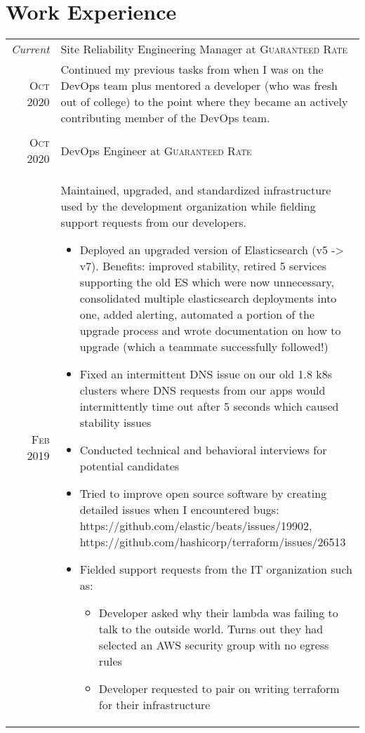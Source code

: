 \documentclass[a4paper,10pt]{article}
\begin{document}
\section{Work Experience}
\begin{tabular}{r|p{13cm}}
 \emph{Current} & Site Reliability Engineering Manager at \textsc{Guaranteed Rate} \\
 \textsc{Oct 2020} &
 \footnotesize{Continued my previous tasks from when I was on the DevOps team plus mentored a developer (who was fresh out of college) to the point where they became an actively contributing member of the DevOps team.}
 \\
 \multicolumn{2}{c}{} \\
 \textsc{Oct 2020} & DevOps Engineer at \textsc{Guaranteed Rate} \\
 \textsc{Feb 2019} &
 \footnotesize{Maintained, upgraded, and standardized infrastructure used by the development organization while fielding support requests from our developers.}
 \begin{itemize}
 \item \footnotesize{Deployed an upgraded version of Elasticsearch (v5 -> v7). Benefits: improved stability, retired 5 services supporting the old ES which were now unnecessary, consolidated multiple elasticsearch deployments into one, added alerting, automated a portion of the upgrade process and wrote documentation on how to upgrade (which a teammate successfully followed!)}
 \item \footnotesize{Fixed an intermittent DNS issue on our old 1.8 k8s clusters where DNS requests from our apps would intermittently time out after 5 seconds which caused stability issues}
 \item \footnotesize{Conducted technical and behavioral interviews for potential candidates}
 \item \footnotesize{Tried to improve open source software by creating detailed issues when I encountered bugs: https://github.com/elastic/beats/issues/19902, https://github.com/hashicorp/terraform/issues/26513}
 \item \footnotesize{Fielded support requests from the IT organization such as:}
   \begin{itemize}
   \item \footnotesize{Developer asked why their lambda was failing to talk to the outside world. Turns out they had selected an AWS security group with no egress rules}
   \item \footnotesize{Developer requested to pair on writing terraform for their infrastructure}

\end{itemize}
\end{itemize}
\end{tabular}
\end{document}

